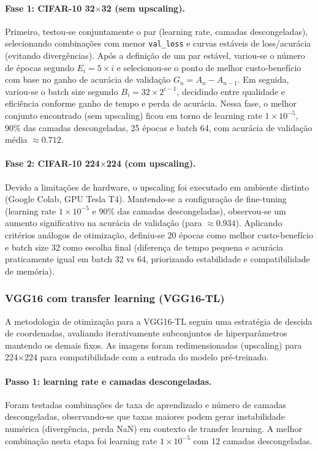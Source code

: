 \documentclass[12pt,a4paper]{article}
\begin{document}
\paragraph{Fase 1: CIFAR-10 32$\times$32 (sem upscaling).}
Primeiro, testou-se conjuntamente o par (learning rate, camadas descongeladas), selecionando combinações com menor \texttt{val\_loss} e curvas estáveis de loss/acurácia (evitando divergências).
Após a definição de um par estável, variou-se o número de épocas segundo $E_i = 5 \times i$ e selecionou-se o ponto de melhor custo-benefício com base no ganho de acurácia de validação $G_n = A_n - A_{n-1}$.
Em seguida, variou-se o batch size segundo $B_i = 32 \times 2^{i-1}$, decidindo entre qualidade e eficiência conforme ganho de tempo e perda de acurácia.
Nessa fase, o melhor conjunto encontrado (sem upscaling) ficou em torno de learning rate $1 \times 10^{-5}$, 90\% das camadas descongeladas, 25 épocas e batch 64, com acurácia de validação média $\approx 0.712$.

\paragraph{Fase 2: CIFAR-10 224$\times$224 (com upscaling).}
Devido a limitações de hardware, o upscaling foi executado em ambiente distinto (Google Colab, GPU Tesla T4).
Mantendo-se a configuração de fine-tuning (learning rate $1 \times 10^{-5}$ e 90\% das camadas descongeladas), observou-se um aumento significativo na acurácia de validação (para $\approx 0.934$).
Aplicando critérios análogos de otimização, definiu-se 20 épocas como melhor custo-benefício e batch size 32 como escolha final (diferença de tempo pequena e acurácia praticamente igual em batch 32 vs 64, priorizando estabilidade e compatibilidade de memória).

\subsubsection{VGG16 com transfer learning (VGG16-TL)}
A metodologia de otimização para a VGG16-TL seguiu uma estratégia de descida de coordenadas, avaliando iterativamente subconjuntos de hiperparâmetros mantendo os demais fixos.
As imagens foram redimensionadas (upscaling) para 224$\times$224 para compatibilidade com a entrada do modelo pré-treinado.

\paragraph{Passo 1: learning rate e camadas descongeladas.}
Foram testadas combinações de taxa de aprendizado e número de camadas descongeladas, observando-se que taxas maiores podem gerar instabilidade numérica (divergência, perda NaN) em contexto de transfer learning.
A melhor combinação nesta etapa foi learning rate $1 \times 10^{-5}$ com 12 camadas descongeladas.
\end{document}
